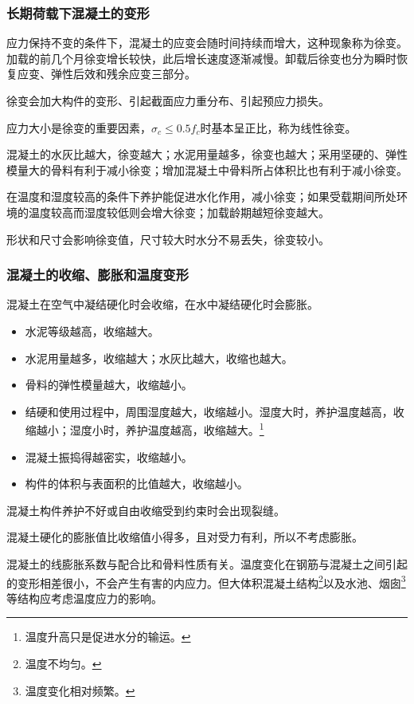 \documentclass{article}
\begin{document}
\subsubsection{长期荷载下混凝土的变形}
\par 应力保持不变的条件下，混凝土的应变会随时间持续而增大，这种现象称为徐变。加载的前几个月徐变增长较快，此后增长速度逐渐减慢。卸载后徐变也分为瞬时恢复应变、弹性后效和残余应变三部分。
\par 徐变会加大构件的变形、引起截面应力重分布、引起预应力损失。
\par 应力大小是徐变的重要因素，$\sigma_c\leq0.5f_c$时基本呈正比，称为线性徐变。
\par 混凝土的水灰比越大，徐变越大；水泥用量越多，徐变也越大；采用坚硬的、弹性模量大的骨料有利于减小徐变；增加混凝土中骨料所占体积比也有利于减小徐变。
\par 在温度和湿度较高的条件下养护能促进水化作用，减小徐变；如果受载期间所处环境的温度较高而湿度较低则会增大徐变；加载龄期越短徐变越大。
\par 形状和尺寸会影响徐变值，尺寸较大时水分不易丢失，徐变较小。
\subsubsection{混凝土的收缩、膨胀和温度变形}
\par 混凝土在空气中凝结硬化时会收缩，在水中凝结硬化时会膨胀。
\begin{itemize}
      \item 水泥等级越高，收缩越大。
      \item 水泥用量越多，收缩越大；水灰比越大，收缩也越大。
      \item 骨料的弹性模量越大，收缩越小。
      \item 结硬和使用过程中，周围湿度越大，收缩越小。湿度大时，养护温度越高，收缩越小；湿度小时，养护温度越高，收缩越大。\footnote{温度升高只是促进水分的输运。}
      \item 混凝土振捣得越密实，收缩越小。
      \item 构件的体积与表面积的比值越大，收缩越小。
\end{itemize}
\par 混凝土构件养护不好或自由收缩受到约束时会出现裂缝。
\par 混凝土硬化的膨胀值比收缩值小得多，且对受力有利，所以不考虑膨胀。
\par 混凝土的线膨胀系数与配合比和骨料性质有关。温度变化在钢筋与混凝土之间引起的变形相差很小，不会产生有害的内应力。但大体积混凝土结构\footnote{温度不均匀。}以及水池、烟囱\footnote{温度变化相对频繁。}等结构应考虑温度应力的影响。
\end{document}
